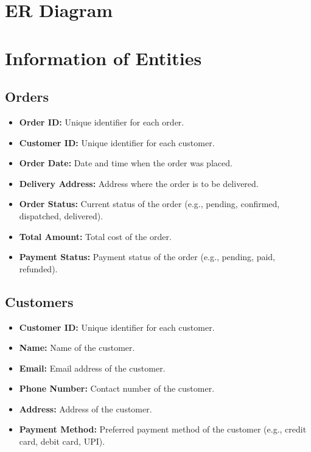 \documentclass{article}
\begin{document}
\pagebreak

\section{ER Diagram}
\pagebreak

\section{Information of Entities}
\subsection{Orders}
\begin{itemize}
    \item \textbf{Order ID:} Unique identifier for each order.
    \item \textbf{Customer ID:} Unique identifier for each customer.
    \item \textbf{Order Date:} Date and time when the order was placed.
    \item \textbf{Delivery Address:} Address where the order is to be delivered.
    \item \textbf{Order Status:} Current status of the order (e.g., pending, confirmed, dispatched, delivered).
    \item \textbf{Total Amount:} Total cost of the order.
    \item \textbf{Payment Status:} Payment status of the order (e.g., pending, paid, refunded).
\end{itemize}

\subsection{Customers}
\begin{itemize}
    \item \textbf{Customer ID:} Unique identifier for each customer.
    \item \textbf{Name:} Name of the customer.
    \item \textbf{Email:} Email address of the customer.
    \item \textbf{Phone Number:} Contact number of the customer.
    \item \textbf{Address:} Address of the customer.
    \item \textbf{Payment Method:} Preferred payment method of the customer (e.g., credit card, debit card, UPI).
\end{itemize}
\end{document}
